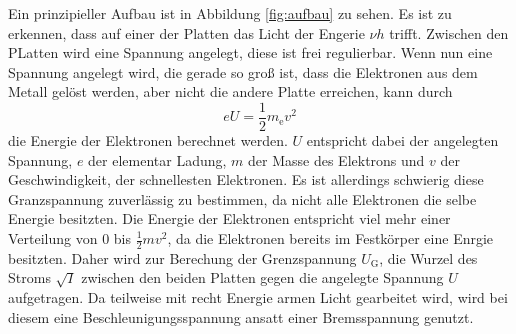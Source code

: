 Ein prinzipieller Aufbau ist in Abbildung \ref{fig:aufbau} zu sehen.
Es ist zu erkennen, dass auf einer der Platten das Licht der Engerie $\nu h$ trifft.
Zwischen den PLatten wird eine Spannung angelegt, diese ist frei regulierbar.
Wenn nun eine Spannung angelegt wird, die gerade so groß ist, dass die Elektronen aus dem Metall gelöst werden, aber nicht die andere Platte erreichen, kann durch
\begin{equation}
eU = \frac{1}{2} m_\text{e} v^2
\label{eq:grenzenergie}
\end{equation}
die Energie der Elektronen berechnet werden.
$U$ entspricht dabei der angelegten Spannung, $e$ der elementar Ladung, $m$ der Masse des Elektrons und $v$ der Geschwindigkeit, der schnellesten Elektronen.
Es ist allerdings schwierig diese Granzspannung zuverlässig zu bestimmen, da nicht alle Elektronen die selbe Energie besitzten.
Die Energie der Elektronen entspricht viel mehr einer Verteilung von $0$ bis $\frac{1}{2}mv^2$, da die Elektronen bereits im Festkörper eine Enrgie besitzten.
Daher wird zur Berechung der Grenzspannung $U_\text{G}$, die Wurzel des Stroms $\sqrt{I}$ zwischen den beiden Platten gegen die angelegte Spannung $U$ aufgetragen.
Da teilweise mit recht Energie armen Licht gearbeitet wird, wird bei diesem eine Beschleunigungsspannung ansatt einer Bremsspannung genutzt.